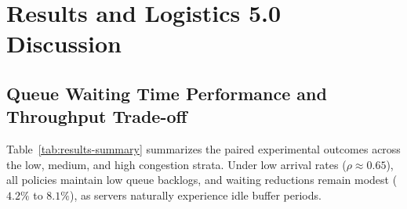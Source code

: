 \documentclass[12pt,a4paper]{article}
\begin{document}
\section{Results and Logistics 5.0 Discussion}
\label{sec:results}

\subsection{Queue Waiting Time Performance and Throughput Trade-off}
Table~\ref{tab:results-summary} summarizes the paired experimental outcomes across the low, medium, and high congestion strata. Under low arrival rates ($\rho \approx 0.65$), all policies maintain low queue backlogs, and waiting reductions remain modest ($4.2\%$ to $8.1\%$), as servers naturally experience idle buffer periods.
\end{document}
